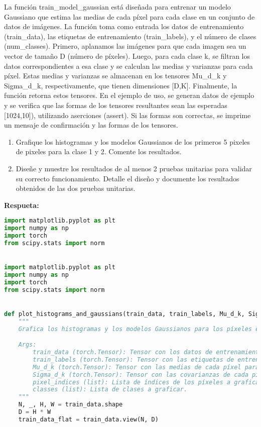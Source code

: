 \documentclass[spanish]{article}
\begin{document}
\begin{enumerate}
\begin{enumerate}
\par La función train\_model\_gaussian está diseñada para entrenar un modelo Gaussiano que estima las medias  de cada píxel para cada clase en un conjunto de datos de imágenes. La función toma como entrada los datos de entrenamiento (train\_data), las etiquetas de entrenamiento (train\_labels), y el número de clases (num\_classes). Primero, aplanamos las imágenes para que cada imagen sea un vector de tamaño 
D (número de píxeles). Luego, para cada clase 
k, se filtran los datos correspondientes a esa clase y se calculan las medias y varianzas para cada píxel. Estas medias y varianzas se almacenan en los tensores Mu\_d\_k y Sigma\_d\_k, respectivamente, que tienen dimensiones [D,K]. Finalmente, la función retorna estos tensores. En el ejemplo de uso, se generan datos de ejemplo y se verifica que las formas de los tensores resultantes sean las esperadas 
[1024,10]), utilizando aserciones (assert). Si las formas son correctas, se imprime un mensaje de confirmación y las formas de los tensores.

\begin{enumerate}
\item Grafique los histogramas y los modelos Gaussianos de los primeros
5 pixeles de pixeles para la clase 1 y 2. Comente los resultados.
\item Diseñe y muestre los resultados de al menos 2 pruebas unitarias para
validar su correcto funcionamiento. Detalle el diseño y documente
los resultados obtenidos de las dos pruebas unitarias.
\end{enumerate}

\vspace{15px}

\textbf{Respueta:}
\vspace{15px}

\begin{lstlisting}[language=Python, caption=Graficacion de Histogramas Y Curvas Gaussianas]
import matplotlib.pyplot as plt
import numpy as np
import torch
from scipy.stats import norm


import matplotlib.pyplot as plt
import numpy as np
import torch
from scipy.stats import norm


def plot_histograms_and_gaussians(train_data, train_labels, Mu_d_k, Sigma_d_k, pixel_indices, classes):
    """
    Grafica los histogramas y los modelos Gaussianos para los píxeles especificados y las clases dadas en plots separados.

    Args:
        train_data (torch.Tensor): Tensor con los datos de entrenamiento de forma [N, 1, 32, 32].
        train_labels (torch.Tensor): Tensor con las etiquetas de entrenamiento de forma [N].
        Mu_d_k (torch.Tensor): Tensor con las medias de cada píxel para cada clase de forma [D, K].
        Sigma_d_k (torch.Tensor): Tensor con las covarianzas de cada píxel para cada clase de forma [D, K].
        pixel_indices (list): Lista de índices de los píxeles a graficar.
        classes (list): Lista de clases a graficar.
    """
    N, _, H, W = train_data.shape
    D = H * W
    train_data_flat = train_data.view(N, D)


\end{lstlisting}
\end{enumerate}
\end{enumerate}
\end{document}
